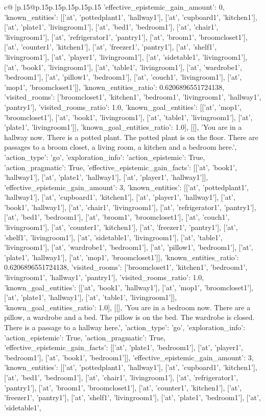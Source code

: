 \documentclass{article}
\begin{document}
{\begin{supertabular}{c@{$\;$}|p{.15\linewidth}@{}p{.15\linewidth}p{.15\linewidth}p{.15\linewidth}p{.15\linewidth}p{.15\linewidth}}
{{{'effective_epistemic_gain_amount': 0, 'known_entities': [['at', 'pottedplant1', 'hallway1'], ['at', 'cupboard1', 'kitchen1'], ['at', 'plate1', 'livingroom1'], ['at', 'bed1', 'bedroom1'], ['at', 'chair1', 'livingroom1'], ['at', 'refrigerator1', 'pantry1'], ['at', 'broom1', 'broomcloset1'], ['at', 'counter1', 'kitchen1'], ['at', 'freezer1', 'pantry1'], ['at', 'shelf1', 'livingroom1'], ['at', 'player1', 'livingroom1'], ['at', 'sidetable1', 'livingroom1'], ['at', 'book1', 'livingroom1'], ['at', 'table1', 'livingroom1'], ['at', 'wardrobe1', 'bedroom1'], ['at', 'pillow1', 'bedroom1'], ['at', 'couch1', 'livingroom1'], ['at', 'mop1', 'broomcloset1']], 'known_entities_ratio': 0.6206896551724138, 'visited_rooms': ['broomcloset1', 'kitchen1', 'bedroom1', 'livingroom1', 'hallway1', 'pantry1'], 'visited_rooms_ratio': 1.0, 'known_goal_entities': [['at', 'mop1', 'broomcloset1'], ['at', 'book1', 'livingroom1'], ['at', 'table1', 'livingroom1'], ['at', 'plate1', 'livingroom1']], 'known_goal_entities_ratio': 1.0}}], [[], 'You are in a hallway now. There is a potted plant. The potted plant is on the floor. There are passages to a broom closet, a living room, a kitchen and a bedroom here.', {'action_type': 'go', 'exploration_info': {'action_epistemic': True, 'action_pragmatic': True, 'effective_epistemic_gain_facts': [['at', 'book1', 'hallway1'], ['at', 'plate1', 'hallway1'], ['at', 'player1', 'hallway1']], 'effective_epistemic_gain_amount': 3, 'known_entities': [['at', 'pottedplant1', 'hallway1'], ['at', 'cupboard1', 'kitchen1'], ['at', 'player1', 'hallway1'], ['at', 'book1', 'hallway1'], ['at', 'chair1', 'livingroom1'], ['at', 'refrigerator1', 'pantry1'], ['at', 'bed1', 'bedroom1'], ['at', 'broom1', 'broomcloset1'], ['at', 'couch1', 'livingroom1'], ['at', 'counter1', 'kitchen1'], ['at', 'freezer1', 'pantry1'], ['at', 'shelf1', 'livingroom1'], ['at', 'sidetable1', 'livingroom1'], ['at', 'table1', 'livingroom1'], ['at', 'wardrobe1', 'bedroom1'], ['at', 'pillow1', 'bedroom1'], ['at', 'plate1', 'hallway1'], ['at', 'mop1', 'broomcloset1']], 'known_entities_ratio': 0.6206896551724138, 'visited_rooms': ['broomcloset1', 'kitchen1', 'bedroom1', 'livingroom1', 'hallway1', 'pantry1'], 'visited_rooms_ratio': 1.0, 'known_goal_entities': [['at', 'book1', 'hallway1'], ['at', 'mop1', 'broomcloset1'], ['at', 'plate1', 'hallway1'], ['at', 'table1', 'livingroom1']], 'known_goal_entities_ratio': 1.0}}], [[], 'You are in a bedroom now. There are a pillow, a wardrobe and a bed. The pillow is on the bed. The wardrobe is closed. There is a passage to a hallway here.', {'action_type': 'go', 'exploration_info': {'action_epistemic': True, 'action_pragmatic': True, 'effective_epistemic_gain_facts': [['at', 'plate1', 'bedroom1'], ['at', 'player1', 'bedroom1'], ['at', 'book1', 'bedroom1']], 'effective_epistemic_gain_amount': 3, 'known_entities': [['at', 'pottedplant1', 'hallway1'], ['at', 'cupboard1', 'kitchen1'], ['at', 'bed1', 'bedroom1'], ['at', 'chair1', 'livingroom1'], ['at', 'refrigerator1', 'pantry1'], ['at', 'broom1', 'broomcloset1'], ['at', 'counter1', 'kitchen1'], ['at', 'freezer1', 'pantry1'], ['at', 'shelf1', 'livingroom1'], ['at', 'plate1', 'bedroom1'], ['at', 'sidetable1', }}}
\end{supertabular}}
\end{document}
